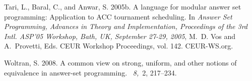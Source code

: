 \begin{thebibliography}{}
{\sc Tari, L.}, {\sc Baral, C.}, {\sc and} {\sc Anwar, S.} 2005b.
\newblock A language for modular answer set programming: Application to {ACC}
  tournament scheduling.
\newblock In {\em Answer Set Programming, Advances in Theory and
  Implementation, Proceedings of the 3rd Intl. ASP'05 Workshop, Bath, UK,
  September 27-29, 2005}, {M.~D. Vos} {and} {A.~Provetti}, Eds. {CEUR} Workshop
  Proceedings, vol. 142. CEUR-WS.org.

{\sc Woltran, S.} 2008.
\newblock A common view on strong, uniform, and other notions of equivalence in
  answer-set programming.
~{\em 8,\/}~2, 217--234.

\end{thebibliography}
